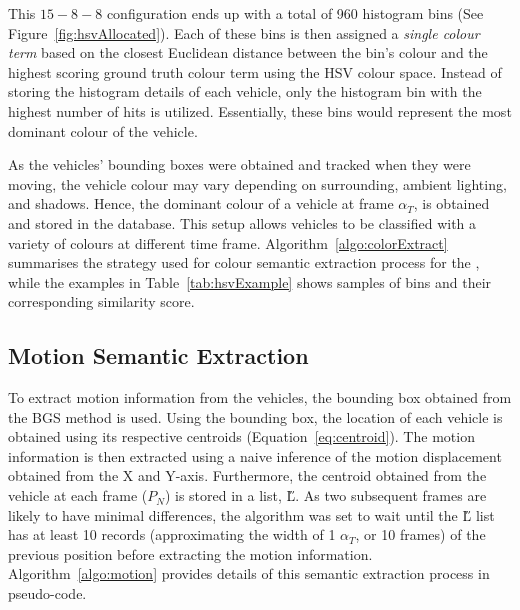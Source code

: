 This $15-8-8$ configuration ends up with a total of 960 histogram bins (See Figure~\ref{fig:hsvAllocated}).
Each of these bins is then assigned a \textit{single colour term} based on the closest Euclidean distance between the bin's colour and the highest scoring ground truth colour term using the HSV colour space.
Instead of storing the histogram details of each vehicle, only the histogram bin with the highest number of hits is utilized.
Essentially, these bins would represent the most dominant colour of the vehicle.%

As the vehicles' bounding boxes were obtained and tracked when they were moving, the vehicle colour may vary depending on surrounding, ambient lighting, and shadows.
Hence, the dominant colour of a vehicle at frame $\alpha_T$, is obtained and stored in the database. This setup allows vehicles to be classified with a variety of colours at different time frame.
Algorithm~\ref{algo:colorExtract} summarises the strategy used for colour semantic extraction process for the \versionOneExt,
while the examples in Table~\ref{tab:hsvExample} shows samples of bins and their corresponding similarity score.


\subsection{Motion Semantic Extraction}
\label{subsec:motions9binextract}

To extract motion information from the vehicles, the bounding box obtained from the BGS method is used.
Using the bounding box, the location of each vehicle is obtained using its respective centroids (Equation~\ref{eq:centroid}).
The motion information is then extracted using a naive inference of the motion displacement obtained from the X and Y-axis.
Furthermore, the centroid obtained from the vehicle at each frame ($P_N$) is stored in a list, \H{L}.
As two subsequent frames are likely to have minimal differences, the algorithm was set to wait until the \H{L} list has at least 10 records (approximating the width of 1 $\alpha_T$, or 10 frames) of the previous position before extracting the motion information.
Algorithm~\ref{algo:motion} provides details of this semantic extraction process in pseudo-code.

